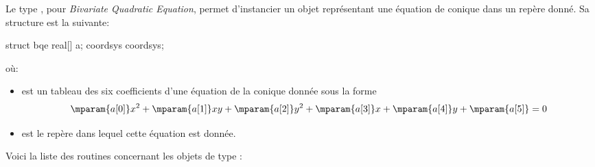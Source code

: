 \documentclass[pdftex]{article}
\begin{document}
Le type , pour \emph{Bivariate Quadratic Equation}, permet
d'instancier un objet représentant une équation de conique dans un
repère donné. Sa structure est la suivante:
\begin{center}
  \begin{Vcolor}
    struct bqe
    {
      real[] a;
      coordsys coordsys;
    }
  \end{Vcolor}
\end{center}
\noindent où:
\begin{itemize}
\item {} est un tableau des six coefficients d'une équation de
  la conique donnée sous la forme \[\mparam{a[0]}x^2 + \mparam{a[1]}xy + \mparam{a[2]}y^2 + \mparam{a[3]}x + \mparam{a[4]}y + \mparam{a[5]}=0\]
\item {} est le repère dans lequel cette équation est donnée.
\end{itemize}
Voici la liste des routines concernant les objets de type :
\end{document}
